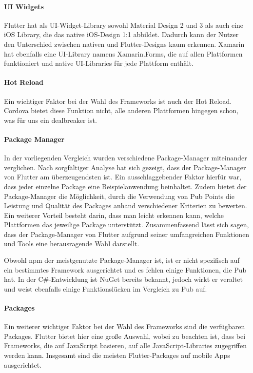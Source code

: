 \paragraph{UI Widgets}
Flutter hat als UI-Widget-Library sowohl Material Design 2 und 3 als auch eine iOS Library, die das native iOS-Design 1:1 abbildet. Dadurch kann der Nutzer den Unterschied zwischen nativen und Flutter-Designs kaum erkennen. Xamarin hat ebenfalls eine UI-Library namens Xamarin.Forms, die auf allen Plattformen funktioniert und native UI-Libraries für jede Plattform enthält.

\paragraph{Hot Reload}
Ein wichtiger Faktor bei der Wahl des Frameworks ist auch der Hot Reload. Cordova bietet diese Funktion nicht, alle anderen Plattformen hingegen schon, was für uns ein dealbreaker ist.

\paragraph{Package Manager}
In der vorliegenden Vergleich wurden verschiedene Package-Manager miteinander verglichen. Nach sorgfältiger Analyse hat sich gezeigt, dass der Package-Manager von Flutter am überzeugendsten ist. Ein ausschlaggebender Faktor hierfür war, dass jeder einzelne Package eine Beispielanwendung beinhaltet. Zudem bietet der Package-Manager die Möglichkeit, durch die Verwendung von Pub Points die Leistung und Qualität des Packages anhand verschiedener Kriterien zu bewerten. Ein weiterer Vorteil besteht darin, dass man leicht erkennen kann, welche Plattformen das jeweilige Package unterstützt. Zusammenfassend lässt sich sagen, dass der Package-Manager von Flutter aufgrund seiner umfangreichen Funktionen und Tools eine herausragende Wahl darstellt.


Obwohl npm der meistgenutzte Package-Manager ist, ist er nicht spezifisch auf ein bestimmtes Framework ausgerichtet und es fehlen einige Funktionen, die Pub hat. In der C\#-Entwicklung ist NuGet bereits bekannt, jedoch wirkt er veraltet und weist ebenfalls einige Funktionslücken im Vergleich zu Pub auf.

\paragraph{Packages}
Ein weiterer wichtiger Faktor bei der Wahl des Frameworks sind die verfügbaren Packages. Flutter bietet hier eine große Auswahl, wobei zu beachten ist, dass bei Frameworks, die auf JavaScript basieren, auf alle JavaScript-Libraries zugegriffen werden kann. Insgesamt sind die meisten Flutter-Packages auf mobile Apps ausgerichtet.

